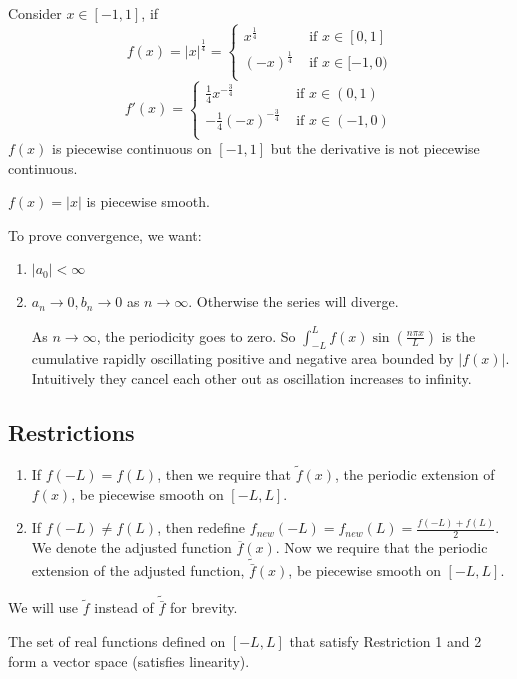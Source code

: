 \documentclass[class=article,crop=false]{standalone}
\begin{document}
\begin{eg}[]
	Consider $x \in [-1,1]$, if 
	\begin{equation*}
		f(x)=|x|^{\frac{1}{4}} =
	\begin{cases}
		x^{\frac{1}{4}} &\text{ if } x \in [0,1] \\
		(-x)^{\frac{1}{4}} & \text{ if } x \in [-1,0) \\
	\end{cases}	
	\end{equation*}
	\begin{equation*}
		f'(x)=
	\begin{cases}
		\frac{1}{4}x^{-\frac{3}{4}} &\text{ if }x \in (0,1)\\ 
		-\frac{1}{4}(-x)^{-\frac{3}{4}} &\text{ if } x \in (-1,0)\\ 
	\end{cases}
	\end{equation*}
	$f(x)$ is piecewise continuous on  $[-1,1]$ but the derivative is not piecewise continuous.
\end{eg}

\begin{eg}[]
	$f(x) = |x|$ is piecewise smooth.
\end{eg}


To prove convergence, we want:
\begin{enumerate}[label=\arabic*)]
	\item $|a_0| < \infty$
	\item $a_n \to 0, b_n \to 0$ as $n \to \infty$. Otherwise the series will diverge.
		\begin{note}[]
			As $n \to \infty$, the periodicity goes to zero. So $ \int_{-L}^{L}  f(x) \sin \left( \frac{ n\pi x}{ L } \right) $ is the cumulative rapidly oscillating positive and negative area bounded by $|f(x)|$. Intuitively they cancel each other out as oscillation increases to infinity.
		\end{note}
	\end{enumerate}

\subsection*{Restrictions}
\begin{enumerate}[label=\arabic*]
	\item If $f(-L) = f(L)$, then we require that  $\tilde{ f } (x)$, the periodic extension of $f(x)$, be piecewise smooth on  $[-L,L]$.
	\item If  $f(-L) \neq f(L)$, then redefine  $f_{new}(-L) = f_{new}(L) = \frac{f(-L)+f(L)}{2} $. We denote the adjusted function $\overline{f}(x)$. Now we require that the periodic extension of the adjusted function, $\tilde{\bar{f}} (x)$, be piecewise smooth on $[-L,L]$.
\end{enumerate}
\begin{notation}
	We will use $\tilde{ f } $ instead of $\tilde{\bar{f}} $ for brevity.
\end{notation}
\begin{lem}[1]
	The set of real functions defined on $[-L,L]$ that satisfy Restriction 1 and 2 form a vector space (satisfies linearity).
\end{lem}
\end{document}
